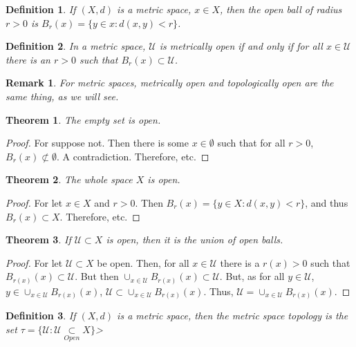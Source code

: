 \documentclass[oneside]{book}
\theoremstyle{mystyle}
\newtheorem{theorem}{Theorem}[section]
\newtheorem{definition}{Definition}[section]
\newtheorem{remark}{Remark}[section]
\begin{document}
\begin{definition}
If $(X,d)$ is a metric space, $x\in X$, then the open ball of radius $r>0$ is $B_{r}(x) = \{y\in x: d(x,y)<r\}$.
\end{definition}

\begin{definition}
In a metric space, $\mathcal{U}$ is metrically open if and only if for all $x\in \mathcal{U}$ there is an $r>0$ such that $B_{r}(x)\subset \mathcal{U}$.
\end{definition}

\begin{remark}
For metric spaces, metrically open and topologically open are the same thing, as we will see.
\end{remark} 

\begin{theorem}
The empty set is open.
\end{theorem}
\begin{proof}
For suppose not. Then there is some $x\in \emptyset$ such that for all $r>0$, $B_{r}(x)\not\subset \emptyset$. A contradiction. Therefore, etc.
\end{proof}

\begin{theorem}
The whole space $X$ is open.
\end{theorem}
\begin{proof}
For let $x\in X$ and $r>0$. Then $B_{r}(x) = \{y\in X:d(x,y)<r\}$, and thus $B_{r}(x)\subset X$. Therefore, etc.
\end{proof}

\begin{theorem}
If $\mathcal{U}\subset X$ is open, then it is the union of open balls.
\end{theorem}
\begin{proof}
For let $\mathcal{U} \subset X$ be open. Then, for all $x\in \mathcal{U}$ there is a $r(x)>0$ such that $B_{r(x)}(x) \subset \mathcal{U}$. But then $\cup_{x\in \mathcal{U}}B_{r(x)}(x)\subset \mathcal{U}$. But, as for all $y\in \mathcal{U}$, $y\in \cup_{x\in \mathcal{U}}B_{r(x)}(x)$, $\mathcal{U} \subset \cup_{x\in \mathcal{U}}B_{r(x)}(x)$. Thus, $\mathcal{U}= \cup_{x\in \mathcal{U}}B_{r(x)}(x)$.
\end{proof}

\begin{definition}
If $(X,d)$ is a metric space, then the metric space topology is the set $\tau = \{\mathcal{U}:\mathcal{U}\underset{Open}\subset X\}$>
\end{definition}
\end{document}
